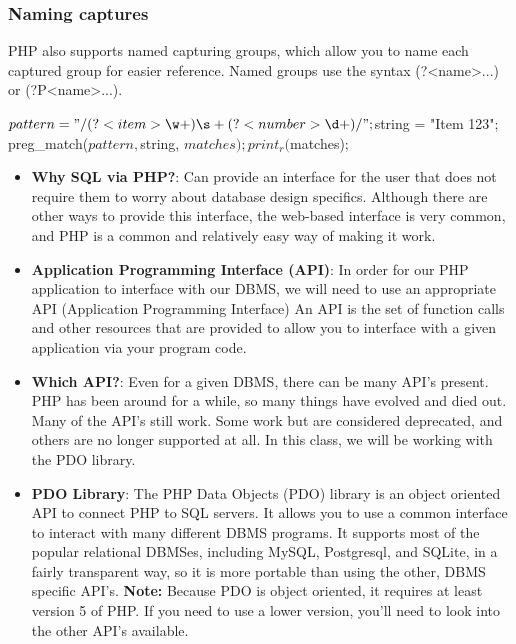 \documentclass{report}
\begin{document}
 \bigbreak \noindent 
 \subsubsection{Naming captures}
 \bigbreak \noindent 
 PHP also supports named capturing groups, which allow you to name each captured group for easier reference. Named groups use the syntax (?<name>...) or (?P<name>...).
 \bigbreak \noindent 
 \begin{phpcode}
     $pattern = "/(?<item>\w+)\s+(?<number>\d+)/";
     $string = "Item 123";
     preg_match($pattern, $string, $matches);
     print_r($matches);
 \end{phpcode}

 \pagebreak 
 \bigbreak \noindent 
     \begin{itemize}
        \item \textbf{Why SQL via PHP?}: Can provide an interface for the user that does not require them to worry about database design specifics.
            \bigbreak \noindent 
            Although there are other ways to provide this interface, the web-based interface is very common, and PHP is a common and relatively easy way of making it work.
        \item \textbf{Application Programming Interface (API)}: In order for our PHP application to interface with our DBMS, we will need to use an appropriate API (Application Programming Interface) An API is the set of function calls and other resources that are provided to allow you to interface with a given application via your program code.
        \item \textbf{Which API?}: Even for a given DBMS, there can be many API’s present. PHP has been around for a while, so many things have evolved and died out. Many of the API’s still work. Some work but are considered deprecated, and others are no longer supported at all. In this class, we will be working with the PDO library.
        \item \textbf{PDO Library}: The PHP Data Objects (PDO) library is an object oriented API to connect PHP to SQL servers. It allows you to use a common interface to interact with many different DBMS programs.
            \bigbreak \noindent 
            It supports most of the popular relational DBMSes, including MySQL, Postgresql, and SQLite, in a fairly transparent way, so it is more portable than using the other, DBMS specific API’s.
            \textbf{Note:} Because PDO is object oriented, it requires at least version 5 of PHP. If you need to use a lower version, you’ll need to look into the other API’s available.

\end{itemize}
\end{document}
